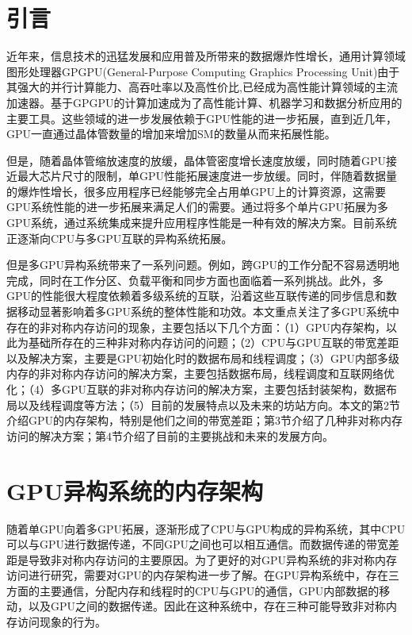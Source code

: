 \documentclass{cjc}
\begin{document}
\maketitle


\section{引言}

近年来，信息技术的迅猛发展和应用普及所带来的数据爆炸性增长，通用计算领域图形处理器GPGPU(General-Purpose Computing Graphics Processing Unit)由于其强大的并行计算能力、高吞吐率以及高性价比,已经成为高性能计算领域的主流加速器。基于GPGPU的计算加速成为了高性能计算、机器学习和数据分析应用的主要工具。这些领域的进一步发展依赖于GPU性能的进一步拓展，直到近几年，GPU一直通过晶体管数量的增加来增加SM的数量从而来拓展性能。

但是，随着晶体管缩放速度的放缓，晶体管密度增长速度放缓，同时随着GPU接近最大芯片尺寸的限制，单GPU性能拓展速度进一步放缓。同时，伴随着数据量的爆炸性增长，很多应用程序已经能够完全占用单GPU上的计算资源，这需要GPU系统性能的进一步拓展来满足人们的需要。通过将多个单片GPU拓展为多GPU系统，通过系统集成来提升应用程序性能是一种有效的解决方案。目前系统正逐渐向CPU与多GPU互联的异构系统拓展。

但是多GPU异构系统带来了一系列问题。例如，跨GPU的工作分配不容易透明地完成，同时在工作分区、负载平衡和同步方面也面临着一系列挑战。此外，多GPU的性能很大程度依赖着多级系统的互联，沿着这些互联传递的同步信息和数据移动显著影响着多GPU系统的整体性能和功效。本文重点关注了多GPU系统中存在的非对称内存访问的现象，主要包括以下几个方面：（1）GPU内存架构，以此为基础所存在的三种非对称内存访问的问题；（2）CPU与GPU互联的带宽差距以及解决方案，主要是GPU初始化时的数据布局和线程调度；（3）GPU内部多级内存的非对称内存访问的解决方案，主要包括数据布局，线程调度和互联网络优化；（4）多GPU互联的非对称内存访问的解决方案，主要包括封装架构，数据布局以及线程调度等方法；（5）目前的发展特点以及未来的坊站方向。本文的第2节介绍GPU的内存架构，特别是他们之间的带宽差距；第3节介绍了几种非对称内存访问的解决方案；第4节介绍了目前的主要挑战和未来的发展方向。

\section{GPU异构系统的内存架构}

随着单GPU向着多GPU拓展，逐渐形成了CPU与GPU构成的异构系统，其中CPU可以与GPU进行数据传递，不同GPU之间也可以相互通信。而数据传递的带宽差距是导致非对称内存访问的主要原因。为了更好的对GPU异构系统的非对称内存访问进行研究，需要对GPU的内存架构进一步了解。在GPU异构系统中，存在三方面的主要通信，分配内存和线程时的CPU与GPU的通信，GPU内部数据的移动，以及GPU之间的数据传递。因此在这种系统中，存在三种可能导致非对称内存访问现象的行为。
\end{document}
